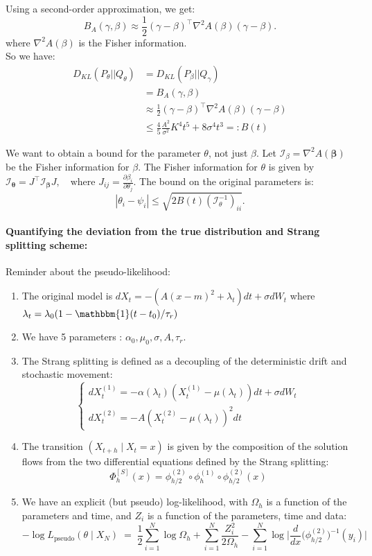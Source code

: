 \documentclass[12pt,a4paper]{article}
\theoremstyle{definition}
\theoremstyle{plain}
\begin{document}
Using a second-order approximation, we get: 
$$
B_A(\gamma, \beta) \approx \frac{1}{2}(\gamma - \beta)^\top  \nabla^2A(\beta)(\gamma - \beta).
$$
where $\nabla^2A(\beta)$ is the Fisher information. \\

So we have: 
\begin{align}
D_{KL}(P_\theta || Q_\theta) &= D_{KL}(P_\beta || Q_\gamma) \\
    &= B_A(\gamma, \beta) \\
    &\approx \frac{1}{2}(\gamma - \beta)^\top \nabla^2A(\beta)(\gamma - \beta) \\
    &\leq \frac{4}{5} \frac{A^2}{\sigma^2}K^4t^5 + 8\sigma^4t^3 =: B(t)
\end{align}

We want to obtain a bound for the parameter $\theta$, not just $\beta$. Let $\mathcal{I}_{\beta} = \nabla^2 A(\bm{\beta})$ be the Fisher information for $\beta$. The Fisher information for $\theta$ is given by $\mathcal{I}_{\bm{\theta}} = J^\top \mathcal{I}_{\bm{\beta}} J, \quad \text{where } J_{ij} = \frac{\partial \beta_i}{\partial \theta_j}$. The bound on the original parameters is: 
$$
|\theta_i - \psi_i | \leq \sqrt{2 B(t) (\mathcal{I}_\theta^{-1})_{ii}}.
$$

\paragraph{Quantifying the deviation from the true distribution and Strang splitting scheme:}

\noindent Reminder about the pseudo-likelihood:
\begin{enumerate}
    \item The original model is $dX_t = - (A(x-m)^2 + \lambda_t)dt + \sigma dW_t$ where $\lambda_t = \lambda_0(1 - \mathbbm{1}(t - t_0)/\tau_r)$
    \item We have 5 parameters : $\alpha_0, \mu_0, \sigma, A, \tau_r$.
    \item The Strang splitting is defined as a decoupling of the deterministic drift and stochastic movement: 
\[
\begin{cases}
dX^{(1)}_t = -\alpha(\lambda_t)(X^{(1)}_t - \mu(\lambda_t))dt + \sigma dW_t \\
dX^{(2)}_t = -A(X^{(2)}_t - \mu(\lambda_t))^2dt
\end{cases}
\]
    \item The transition $(X_{t+h} \mid X_t = x)$ is given by the composition of the solution flows from the two differential equations defined by the Strang splitting: 
    \[  \Phi^{[S]}_h(x)=\phi^{(2)}_{h/2}\circ\phi^{(1)}_{h}\circ\phi^{(2)}_{h/2}(x)
    \]

    \item We have an explicit (but pseudo) log-likelihood, with $\Omega_h$ is a function of the parameters and time, and $Z_i$ is a function of the parameters, time and data:
    $$
    -\log L_{\mathrm{pseudo}}(\theta\mid X_N)\;=\;
\frac12\sum_{i=1}^{N}\log\Omega_h
+\sum_{i=1}^{N}\frac{Z_i^2}{2\Omega_h}
-\sum_{i=1}^{N}\log\Big| \frac{d}{dx} \big(\phi^{(2)}_{h/2}\big)^{-1}(y_i)\Big|
    $$
\end{enumerate}
\end{document}
